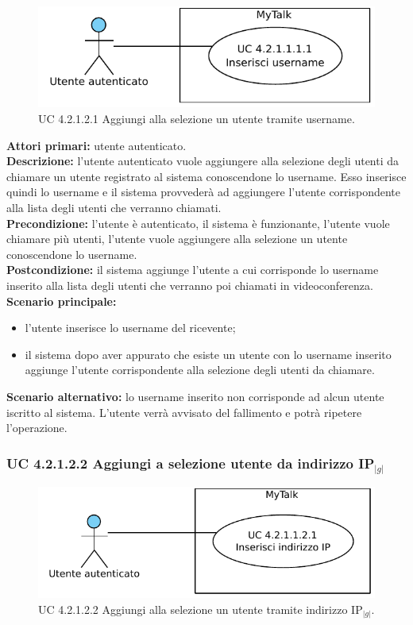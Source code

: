 \begin{figure}[htbp]
\centering
\includegraphics[scale=0.7]{./casi_uso/UC4-2-1-2-1.pdf}
\caption{UC 4.2.1.2.1 Aggiungi alla selezione un  utente tramite username.}
\end{figure}

\noindent
\textbf{Attori primari:} utente autenticato.\\
\textbf{Descrizione:} l'utente autenticato vuole aggiungere alla selezione degli utenti da chiamare un utente registrato al sistema conoscendone lo username. Esso inserisce quindi lo username e il sistema provvederà ad aggiungere l'utente corrispondente alla lista degli utenti che verranno chiamati.\\
\textbf{Precondizione:} l'utente è autenticato, il sistema è funzionante, l'utente vuole chiamare più utenti, l'utente vuole aggiungere alla selezione un utente conoscendone lo username.\\
\textbf{Postcondizione:} il sistema aggiunge l'utente a cui corrisponde lo username inserito alla lista degli utenti che verranno poi chiamati in videoconferenza.\\
\textbf{Scenario principale:}
\begin{itemize}
\item l'utente inserisce lo username del ricevente;
\item il sistema dopo aver appurato che esiste un utente con lo username inserito aggiunge l'utente corrispondente alla selezione degli utenti da chiamare.
\end{itemize}
\textbf{Scenario alternativo:} lo username inserito non corrisponde ad alcun utente iscritto al sistema. L'utente verrà avvisato del fallimento e potrà ripetere l'operazione.

\subsubsection{UC 4.2.1.2.2 Aggiungi a selezione utente da indirizzo IP$_{|g|}$}

\begin{figure}[htbp]
\centering
\includegraphics[scale=0.7]{./casi_uso/UC4-2-1-2-2.pdf}
\caption{UC 4.2.1.2.2 Aggiungi alla selezione un utente tramite indirizzo IP$_{|g|}$.}
\end{figure}

